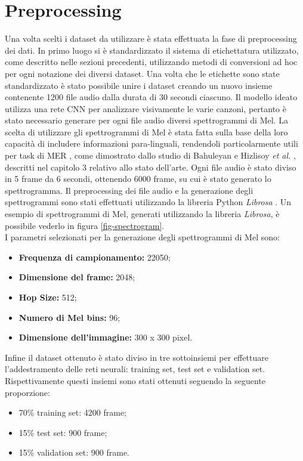 \documentclass[11pt]{report}
\begin{document}
\newpage

\section{Preprocessing}

Una volta scelti i dataset da utilizzare è stata effettuata la fase di preprocessing dei dati. In primo luogo si è standardizzato il sistema di etichettatura utilizzato, come descritto nelle sezioni precedenti, utilizzando metodi di conversioni ad hoc per ogni notazione dei diversi dataset. Una volta che le etichette sono state standardizzato è stato possibile unire i dataset creando un nuovo insieme contenente 1200 file audio dalla durata di 30 secondi ciascuno. Il modello ideato utilizza una rete CNN per analizzare visivamente le varie canzoni, pertanto è stato necessario generare per ogni file audio diversi spettrogrammi di Mel. La scelta di utilizzare gli spettrogrammi di Mel è stata fatta sulla base della loro capacità di includere informazioni para-linguali, rendendoli particolarmente utili per task di MER \cite{ma2018emotion}, come dimostrato dallo studio di Bahuleyan \cite{bahuleyan2018music} e Hizlisoy \textit{et al.} \cite{hizlisoy2021music}, descritti nel capitolo 3 relativo allo stato dell'arte. Ogni file audio è stato diviso in 5 frame da 6 secondi, ottenendo 6000 frame, su cui è stato generato lo spettrogramma. Il preprocessing dei file audio e la generazione degli spettrogrammi sono stati effettuati utilizzando la libreria Python \textit{Librosa} \cite{mcfee2015librosa}. Un esempio di spettrogrammi di Mel, generati utilizzando la libreria \textit{Librosa}, è possibile vederlo in figura \ref{fig-spectrogram}.\\


I parametri selezionati per la generazione degli spettrogrammi di Mel sono:
\begin{itemize}
    \item \textbf{Frequenza di campionamento:} 22050;
    \item \textbf{Dimensione del frame:} 2048;
    \item \textbf{Hop Size:} 512;
    \item \textbf{Numero di Mel bins:} 96;
    \item \textbf{Dimensione dell'immagine:} 300 x 300 pixel.
\end{itemize}

Infine il dataset ottenuto è stato diviso in tre sottoinsiemi per effettuare l'addestramento delle reti neurali: training set, test set e validation set. Rispettivamente questi insiemi sono stati ottenuti seguendo la seguente proporzione:
\begin{itemize}
    \item 70\% training set: 4200 frame;
    \item 15\% test set: 900 frame;
        \item 15\% validation set: 900 frame.
\end{itemize}
\end{document}
